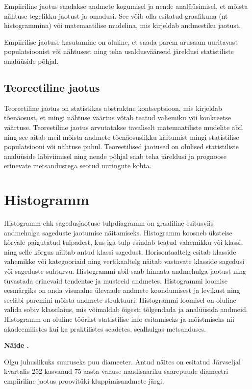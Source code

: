 \documentclass[
]{book}
\newcounter{naidis}[chapter]
\newenvironment{naidis}
{%
\definecolor{shadecolor}{rgb}{200, 200, 0}
\par\parindent 0pt
\begin{framed}
\begin{naitefont}
\refstepcounter{naidis}\textbf{Näide \thenaidis.}
}
{%
\end{naitefont}%
\end{framed}
}%
\begin{document}
Empiiriline jaotus saadakse andmete kogumisel ja nende analüüsimisel, et mõista nähtuse tegelikku jaotust ja omadusi. See võib olla esitatud graafikuna (nt histogrammina) või matemaatilise mudelina, mis kirjeldab andmestiku jaotust.

Empiirilise jaotuse kasutamine on oluline, et saada parem arusaam uuritavast populatsioonist või nähtusest ning teha usaldusväärseid järeldusi statistiliste analüüside põhjal.

\subsection{Teoreetiline jaotus}\label{teoreetiline-jaotus}

Teoreetiline jaotus on statistikas abstraktne kontseptsioon, mis kirjeldab tõenäosust, et mingi nähtuse väärtus võtab teatud vahemiku või konkreetse väärtuse. Teoreetiline jaotus arvutatakse tavaliselt matemaatiliste mudelite abil ning see aitab meil mõista andmete tõenäosuslikku käitumist mingi statistilise populatsiooni või nähtuse puhul. Teoreetilised jaotused on olulised statistiliste analüüside läbiviimisel ning nende põhjal saab teha järeldusi ja prognoose erinevate metsandustega seotud uuringute kohta.

\section{Histogramm}\label{histogramm}

Histogramm ehk sagedusjaotuse tulpdiagramm on graafiline esitusviis andmehulga sageduste jaotumise näitamiseks. Histogramm koosneb üksteise kõrvale paigutatud tulpadest, kus iga tulp esindab teatud vahemikku või klassi, ning selle kõrgus näitab antud klassi sagedust. Horisontaaltelg esitab klasside vahemikke või kategooriaid ning vertikaaltelg näitab vastavate klasside sagedusi või sageduste suhtarvu. Histogrammi abil saab hinnata andmehulga jaotust ning tuvastada erinevaid tendentse ja mustreid andmetes. Histogrammi loomise eesmärgiks on anda visuaalne ülevaade andmete koondumisest ja levikust ning seeläbi paremini mõista andmete struktuuri. Histogrammi loomisel on oluline valida sobiv klassilaius, mis võimaldab õigesti tõlgendada ja analüüsida andmeid. Histogramm on oluline tööriist statistilise info esitamiseks ja mõistmiseks nii akadeemilistes kui ka praktilistes seadetes, sealhulgas metsanduses.

\begin{naidis}
Olgu juhuslikuks suuruseks puu diameeter. Antud näites on esitatud Järvseljal kvartalis 252  kasvanud 75 aasta vanuse naadisaariku saarepuude diameetri empiiriline jaotus proovitüki kluppimisandmete järgi. 
\end{naidis}
\end{document}
